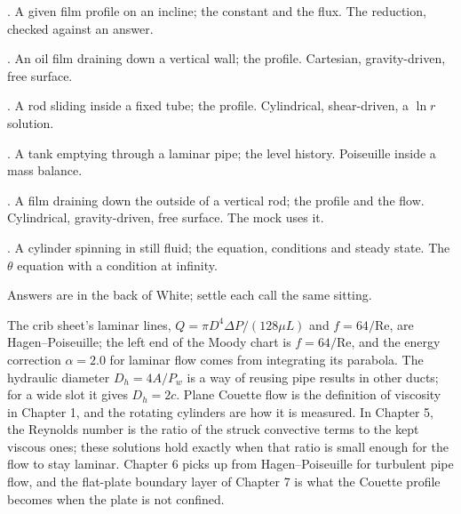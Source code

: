 \begin{ladder}
\item {}. A given film profile on an incline; the constant and the flux. The reduction, checked against an answer.
\item {}. An oil film draining down a vertical wall; the profile. Cartesian, gravity-driven, free surface.
\item {}. A rod sliding inside a fixed tube; the profile. Cylindrical, shear-driven, a $\ln r$ solution.
\item {}. A tank emptying through a laminar pipe; the level history. Poiseuille inside a mass balance.
\item {}. A film draining down the outside of a vertical rod; the profile and the flow. Cylindrical, gravity-driven, free surface. The mock uses it.
\item {}. A cylinder spinning in still fluid; the equation, conditions and steady state. The $\theta$ equation with a condition at infinity.
\end{ladder}
Answers are in the back of White; settle each call the same sitting.


\begin{hides}
The crib sheet's laminar lines, $Q = \pi D^4\Delta P/(128\mu L)$ and $f = 64/\text{Re}$, are Hagen--Poiseuille; the left end of the Moody chart is $f = 64/\text{Re}$, and the energy correction $\alpha = 2.0$ for laminar flow comes from integrating its parabola. The hydraulic diameter $D_h = 4A/P_w$ is a way of reusing pipe results in other ducts; for a wide slot it gives $D_h = 2c$. Plane Couette flow is the definition of viscosity in Chapter 1, and the rotating cylinders are how it is measured. In Chapter 5, the Reynolds number is the ratio of the struck convective terms to the kept viscous ones; these solutions hold exactly when that ratio is small enough for the flow to stay laminar. Chapter 6 picks up from Hagen--Poiseuille for turbulent pipe flow, and the flat-plate boundary layer of Chapter 7 is what the Couette profile becomes when the plate is not confined.
\end{hides}
